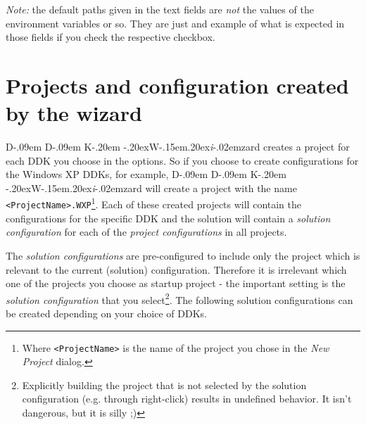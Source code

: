 \documentclass[a4paper,titlepage]{report}
\def\ddkwiz{\texorpdfstring{D\kern-.09em D\kern-.09em K\kern-.20em \raise-.20ex\hbox{W}\kern-.15em\raise.20ex\hbox{\it{i}}\kern-.02em{zard}}{DDKWizard}}
\begin{document}
\emph{Note:} the default paths given in the text fields are \emph{not} the
values of the environment variables or so. They are just and example of what
is expected in those fields if you check the respective checkbox.

\section{Projects and configuration created by the wizard}
\ddkwiz{} creates a project for each DDK you choose in the options. So if
you choose to create configurations for the Windows XP DDKs, for example,
\ddkwiz{} will create a project with the name \texttt{<ProjectName>.WXP}\footnote{Where
\texttt{<ProjectName>} is the name of the project you chose in the \emph{New Project} dialog.}.
Each of these created projects will contain the configurations for the specific
DDK and the solution will contain a \emph{solution configuration} for each of the
\emph{project configurations} in all projects.

The \emph{solution configurations} are pre-configured to include only the
project which is relevant to the current (solution) configuration. Therefore it is
irrelevant which one of the projects you choose as startup project - the
important setting is the \emph{solution configuration} that you
select\footnote{Explicitly building the project that is not selected by the
solution configuration (e.g. through right-click) results in undefined
behavior. It isn't dangerous, but it is silly \textsf{;)}}. The following
solution configurations can be created depending on your choice of DDKs.
\end{document}

